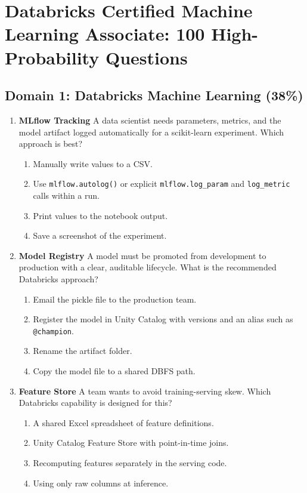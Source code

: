 \documentclass{article}
\begin{document}
	
	\section*{Databricks Certified Machine Learning Associate: 100 High-Probability Questions}
	
	\subsection*{Domain 1: Databricks Machine Learning (38\%)}
	
	\begin{enumerate}[label=\textbf{Q\arabic*.}]
		
		\item \textbf{MLflow Tracking}
		A data scientist needs parameters, metrics, and the model artifact logged automatically for a scikit-learn experiment. Which approach is best?
		\begin{enumerate}[label=\Alph*.]
			\item Manually write values to a CSV.
			\item Use \texttt{mlflow.autolog()} or explicit \texttt{mlflow.log\_param} and \texttt{log\_metric} calls within a run.
			\item Print values to the notebook output.
			\item Save a screenshot of the experiment.
		\end{enumerate}
		
		\item \textbf{Model Registry}
		A model must be promoted from development to production with a clear, auditable lifecycle. What is the recommended Databricks approach?
		\begin{enumerate}[label=\Alph*.]
			\item Email the pickle file to the production team.
			\item Register the model in Unity Catalog with versions and an alias such as \texttt{@champion}.
			\item Rename the artifact folder.
			\item Copy the model file to a shared DBFS path.
		\end{enumerate}
		
		\item \textbf{Feature Store}
		A team wants to avoid training-serving skew. Which Databricks capability is designed for this?
		\begin{enumerate}[label=\Alph*.]
			\item A shared Excel spreadsheet of feature definitions.
			\item Unity Catalog Feature Store with point-in-time joins.
			\item Recomputing features separately in the serving code.
			\item Using only raw columns at inference.
		\end{enumerate}
		

\end{enumerate}
\end{document}
